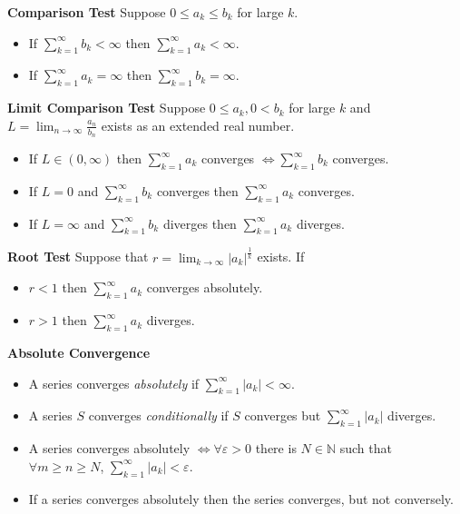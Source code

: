 \documentclass[10pt,landscape]{article}
\begin{document}
\begin{multicols}{3}
\textbf{Comparison Test} Suppose $0 \leq a_k \leq b_k$ for large $k$. 
\begin{itemize}
	\item If $ \displaystyle \sum_{k=1}^{\infty}b_k < \infty$ then $\displaystyle \sum_{k=1}^{\infty} a_k < \infty$.
	\item  If $ \displaystyle \sum_{k=1}^{\infty}a_k = \infty$ then $\displaystyle \sum_{k=1}^{\infty} b_k = \infty$.
\end{itemize}

\textbf{Limit Comparison Test} Suppose $0 \leq a_k, 0 < b_k$ for large $k$ and $ L = \lim_{n\rightarrow \infty} \frac{a_n}{b_n}$ exists as an extended real number.
\begin{itemize}
	\item If $L \in (0,\infty)$ then $\displaystyle \sum_{k=1}^{\infty} a_k$ converges $\iff \displaystyle \sum_{k=1}^{\infty} b_k$ converges.
	\item If $L = 0 $ and $\displaystyle \sum_{k=1}^{\infty} b_k$ converges then $ \displaystyle \sum_{k=1}^{\infty} a_k$ converges.
	\item If $L = \infty $ and $\displaystyle \sum_{k=1}^{\infty} b_k$ diverges then $ \displaystyle \sum_{k=1}^{\infty} a_k$ diverges.
\end{itemize}

\textbf{Root Test} Suppose that $r = \lim_{k \rightarrow \infty} |a_k|^{\frac{1}{k}}$ exists. If 
\begin{itemize}
	\item $r<1$ then $\displaystyle \sum_{k=1}^{\infty}a_k$ converges absolutely.
	\item $r>1$ then $\displaystyle \sum_{k=1}^{\infty}a_k$ diverges.
\end{itemize}

\textbf{Absolute Convergence}
\begin{itemize}
	\item A series converges \emph{absolutely} if $ \displaystyle \sum_{k=1}^{\infty}|a_k| < \infty$.
	\item A series $S$ converges \emph{conditionally} if $S$ converges but $\displaystyle \sum_{k=1}^{\infty}|a_k|$ diverges.
	\item A series converges absolutely $\iff \forall \varepsilon>0$ there is $N\in \mathbb{N}$ such that $\forall m \geq n \geq N$, $ \displaystyle \sum_{k=1}^{\infty}|a_k| < \varepsilon.$
	\item If a series converges absolutely then the series converges, but not conversely.
\end{itemize}


\end{multicols}
\end{document}
